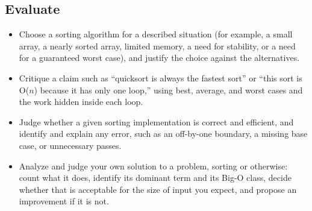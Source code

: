 \documentclass[11pt]{article}
\begin{document}
\subsection*{Evaluate}
\begin{itemize}[leftmargin=1.4em]
  \item Choose a sorting algorithm for a described situation (for example, a small array, a
    nearly sorted array, limited memory, a need for stability, or a need for a guaranteed
    worst case), and justify the choice against the alternatives.
  \item Critique a claim such as ``quicksort is always the fastest sort'' or ``this sort is
    O($n$) because it has only one loop,'' using best, average, and worst cases and the work
    hidden inside each loop.
  \item Judge whether a given sorting implementation is correct and efficient, and identify
    and explain any error, such as an off-by-one boundary, a missing base case, or
    unnecessary passes.
  \item Analyze and judge your own solution to a problem, sorting or otherwise: count what it
    does, identify its dominant term and its Big-O class, decide whether that is acceptable
    for the size of input you expect, and propose an improvement if it is not.
\end{itemize}
\end{document}
